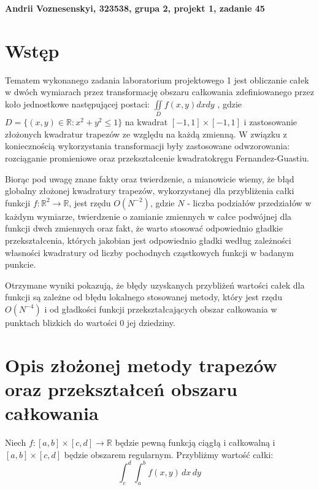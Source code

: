 \documentclass[a4paper,12pt]{article}
\begin{document}
\def\tablename{Tabela} %


\noindent
\textbf{Andrii Voznesenskyi, 323538, grupa 2, projekt 1, zadanie 45}


\section*{Wstęp} %
Tematem wykonanego zadania laboratorium projektowego 1 jest obliczanie całek w dwóch wymiarach przez transformację obszaru całkowania zdefiniowanego przez koło jednostkowe następującej postaci:
$\underset{D}{\iint} f(x,y)dxdy$
, gdzie 
$D = \{ (x,y)\in \mathbb{R} : x^2 + y^2 \leq 1\}$
na kwadrat $[-1,1]  \times [-1,1]$ i zastosowanie złożonych kwadratur trapezów ze względu na każdą zmienną. W związku z koniecznością wykorzystania transformacji były zastosowane odwzorowania: rozciąganie promieniowe oraz przekształcenie kwadratokręgu Fernandez-Guastiu. 

Biorąc pod uwagę znane fakty oraz twierdzenie, a mianowicie wiemy, że błąd globalny złożonej kwadratury trapezów, wykorzystanej dla przybliżenia całki funkcji $f: \mathbb{R}^2 \xrightarrow{} \mathbb{R}$, jest rzędu $O(N^{-2})$, gdzie $N$ - liczba podziałów przedziałów w każdym wymiarze, twierdzenie o zamianie zmiennych w całce podwójnej dla funkcji dwch zmiennych oraz fakt, że warto stosować odpowiednio gładkie przekształcenia, których jakobian jest odpowiednio gładki według zależności własności kwadratury od liczby pochodnych cząstkowych funkcji w badanym punkcie. 

Otrzymane wyniki pokazują, że błędy uzyskanych przybliżeń wartości całek dla funkcji są zależne od błędu lokalnego stosowanej metody, który jest rzędu $O(N^{-4})$ i od gładkości funkcji przekształcających obszar całkowania w punktach blizkich do wartości $0$ jej dziedziny.
\section*{Opis złożonej metody trapezów oraz przekształceń obszaru całkowania}


Niech $f : [a,b]  \times [c,d]  \xrightarrow{} \mathbb{R}$ będzie pewną funkcją ciągłą i całkowalną i $[a,b]  \times [c,d] $ będzie obszarem regularnym. Przybliżmy wartość całki:
\noindent\begin{equation}
\int_{c}^{d} \int_{a}^{b}f(x,y) \,dx\,dy
\end{equation}
\end{document}

